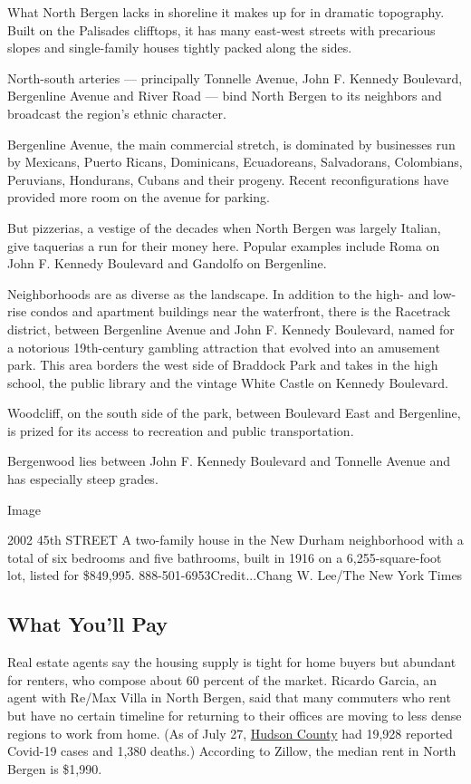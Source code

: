 What North Bergen lacks in shoreline it makes up for in dramatic
topography. Built on the Palisades clifftops, it has many east-west
streets with precarious slopes and single-family houses tightly packed
along the sides.

North-south arteries --- principally Tonnelle Avenue, John F. Kennedy
Boulevard, Bergenline Avenue and River Road --- bind North Bergen to its
neighbors and broadcast the region's ethnic character.

Bergenline Avenue, the main commercial stretch, is dominated by
businesses run by Mexicans, Puerto Ricans, Dominicans, Ecuadoreans,
Salvadorans, Colombians, Peruvians, Hondurans, Cubans and their progeny.
Recent reconfigurations have provided more room on the avenue for
parking.

But pizzerias, a vestige of the decades when North Bergen was largely
Italian, give taquerias a run for their money here. Popular examples
include Roma on John F. Kennedy Boulevard and Gandolfo on Bergenline.

Neighborhoods are as diverse as the landscape. In addition to the high-
and low-rise condos and apartment buildings near the waterfront, there
is the Racetrack district, between Bergenline Avenue and John F. Kennedy
Boulevard, named for a notorious 19th-century gambling attraction that
evolved into an amusement park. This area borders the west side of
Braddock Park and takes in the high school, the public library and the
vintage White Castle on Kennedy Boulevard.

Woodcliff, on the south side of the park, between Boulevard East and
Bergenline, is prized for its access to recreation and public
transportation.

Bergenwood lies between John F. Kennedy Boulevard and Tonnelle Avenue
and has especially steep grades.

Image

2002 45th STREET \textbar{} A two-family house in the New Durham
neighborhood with a total of six bedrooms and five bathrooms, built in
1916 on a 6,255-square-foot lot, listed for \$849,995.
888-501-6953Credit...Chang W. Lee/The New York Times

\hypertarget{what-youll-pay}{%
\subsection{What You'll Pay}\label{what-youll-pay}}

Real estate agents say the housing supply is tight for home buyers but
abundant for renters, who compose about 60 percent of the market.
Ricardo Garcia, an agent with Re/Max Villa in North Bergen, said that
many commuters who rent but have no certain timeline for returning to
their offices are moving to less dense regions to work from home. (As of
July 27,
\href{https://hudson-county-coronavirus-resources-hudsoncogis.hub.arcgis.com/}{Hudson
County} had 19,928 reported Covid-19 cases and 1,380 deaths.) According
to Zillow, the median rent in North Bergen is \$1,990.

